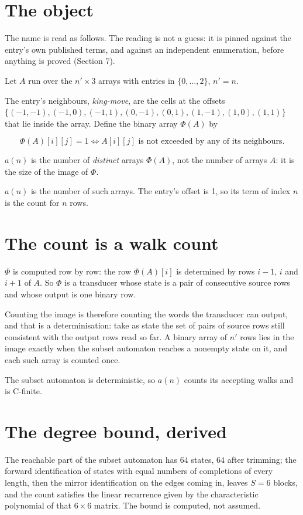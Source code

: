 \documentclass[11pt]{article}
\theoremstyle{definition}
\begin{document}
\section{The object}

The name is read as follows. The reading is not a guess: it is pinned against the entry's own published terms, and against an independent enumeration, before anything is proved (Section 7).

Let $A$ run over the $n' \times 3$ arrays with entries in $\{0,\dots,2\}$, $n' = n$.

The entry's neighbours, {\itshape king-move}, are the cells at the offsets $\{(-1,-1), (-1,0), (-1,1), (0,-1), (0,1), (1,-1), (1,0), (1,1)\}$ that lie inside the array. Define the binary array $\Phi(A)$ by

\[\Phi(A)[i][j] = 1 \iff A[i][j] \text{ is not exceeded by any of its neighbours}.\]

$a(n)$ is the number of {\itshape distinct} arrays $\Phi(A)$, not the number of arrays $A$: it is the size of the image of $\Phi$.

$a(n)$ is the number of such arrays. The entry's offset is 1, so its term of index $n$ is the count for $n$ rows.

\section{The count is a walk count}

$\Phi$ is computed row by row: the row $\Phi(A)[i]$ is determined by rows $i-1$, $i$ and $i+1$ of $A$. So $\Phi$ is a transducer whose state is a pair of consecutive source rows and whose output is one binary row.

Counting the image is therefore counting the words the transducer can output, and that is a determinisation: take as state the set of pairs of source rows still consistent with the output rows read so far. A binary array of $n'$ rows lies in the image exactly when the subset automaton reaches a nonempty state on it, and each such array is counted once.

The subset automaton is deterministic, so $a(n)$ counts its accepting walks and is C-finite.

\section{The degree bound, derived}

The reachable part of the subset automaton has $64$ states, $64$ after trimming; the forward identification of states with equal numbers of completions of every length, then the mirror identification on the edges coming in, leaves $S = 6$ blocks, and the count satisfies the linear recurrence given by the characteristic polynomial of that $6\times6$ matrix. The bound is computed, not assumed.
\end{document}
